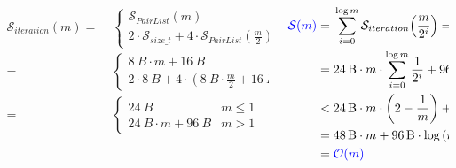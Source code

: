         \begin{frame}{\insertionseriessortrecursivecostframe}
            \begin{columns}[c]
                \begin{column}{0.48\textwidth}
                    \tiny
                    \begin{align*}
                        \mathcal{S}_{iteration}{\left(m\right)} = & \; \begin{cases}
                            \mathcal{S}_{PairList}{\left(m\right)} & m \leq 1 \\
                            2 \cdot \mathcal{S}_{size\_t} + 4 \cdot \mathcal{S}_{PairList}{\left(\frac{m}{2}\right)} + \mathcal{S}_{PairList}{\left(m\right)} & m > 1
                        \end{cases} \\
                        = & \; \begin{cases}
                            \SI{8}{B} \cdot m + \SI{16}{B} & m \leq 1 \\
                            2 \cdot \SI{8}{B} + 4 \cdot \left(\SI{8}{B} \cdot \frac{m}{2} + \SI{16}{B}\right) + \left(\SI{8}{B} \cdot m + \SI{16}{B}\right) & m > 1
                        \end{cases}  \\
                        = & \; \begin{cases}
                            \SI{24}{B} & m \leq 1 \\
                            \SI{24}{B} \cdot m + \SI{96}{B} & m > 1
                        \end{cases}
                    \end{align*}
                \end{column}

                \begin{column}{0.48\textwidth}
                    \footnotesize
                    \begin{align*}
                        \textcolor{blue}{\mathcal{S}{\left(m\right)}} = & \; \sum_{i = 0}^{\log{m}}{\mathcal{S}_{iteration}{\left(\frac{m}{2^i}\right)}} = \\
                        = & \; \SI{24}{B} \cdot m \cdot \sum_{i = 0}^{\log{m}}{\frac{1}{2^i}} + \SI{96}{B} \cdot \sum_{i = 0}^{\log{m}}{1} = \\
                        < & \; \SI{24}{B} \cdot m \cdot \left(2 - \frac{1}{m}\right) + \SI{96}{B} \cdot \left(\log{m} + 1\right) = \\
                        = & \; \SI{48}{B} \cdot m + \SI{96}{B} \cdot \log{\left(m\right)} + \SI{72}{B} \\
                        = & \; \textcolor{blue}{\mathcal{O}{\left(m\right)}}
                    \end{align*}
                \end{column}
            \end{columns}
        \end{frame}

